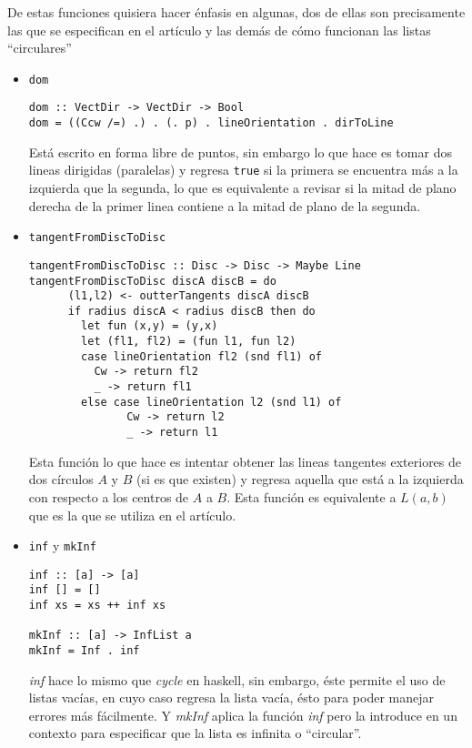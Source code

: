 \documentclass[12pt]{article}
\begin{document}
De estas funciones quisiera hacer énfasis en algunas, dos de ellas son precisamente las que se especifican en el artículo y las demás de cómo funcionan las listas ``circulares''

\begin{itemize}
\item \texttt{dom}

  \begin{verbatim}
dom :: VectDir -> VectDir -> Bool
dom = ((Ccw /=) .) . (. p) . lineOrientation . dirToLine
  \end{verbatim}

  Está escrito en forma libre de puntos, sin embargo lo que hace es tomar dos lineas dirigidas (paralelas) y regresa \texttt{true} si la primera se encuentra más a la izquierda que la segunda, lo que es equivalente a revisar si la mitad de plano derecha de la primer linea contiene a la mitad de plano de la segunda.

\item \texttt{tangentFromDiscToDisc}

  \begin{verbatim}
tangentFromDiscToDisc :: Disc -> Disc -> Maybe Line
tangentFromDiscToDisc discA discB = do
      (l1,l2) <- outterTangents discA discB
      if radius discA < radius discB then do
        let fun (x,y) = (y,x)
        let (fl1, fl2) = (fun l1, fun l2)
        case lineOrientation fl2 (snd fl1) of
          Cw -> return fl2
          _ -> return fl1
        else case lineOrientation l2 (snd l1) of
               Cw -> return l2
               _ -> return l1
  \end{verbatim}

  Esta función lo que hace es intentar obtener las lineas tangentes exteriores de dos círculos $A$ y $B$ (si es que existen) y regresa aquella que está a la izquierda con respecto a los centros de $A$ a $B$. Esta función es equivalente a $L(a,b)$ que es la que se utiliza en el artículo.

\item \texttt{inf} y \texttt{mkInf}

  \begin{verbatim}
inf :: [a] -> [a]
inf [] = []
inf xs = xs ++ inf xs

mkInf :: [a] -> InfList a
mkInf = Inf . inf    
  \end{verbatim}

  \textit{inf} hace lo mismo que \textit{cycle} en haskell, sin embargo, éste permite el uso de listas vacías, en cuyo caso regresa la lista vacía, ésto para poder manejar errores más fácilmente. Y \textit{mkInf} aplica la función \textit{inf} pero la introduce en un contexto para especificar que la lista es infinita o ``circular''.


\end{itemize}
\end{document}
